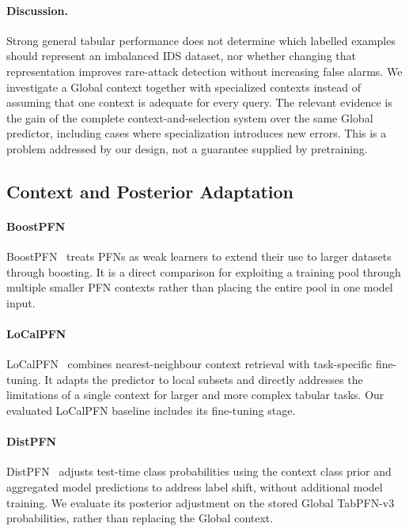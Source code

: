 \documentclass[sigconf,anonymous,pbalance]{acmart}
\begin{document}
\paragraph{Discussion.}
Strong general tabular performance does not determine which labelled examples should represent an imbalanced IDS dataset, nor whether changing that representation improves rare-attack detection without increasing false alarms. We investigate a Global context together with specialized contexts instead of assuming that one context is adequate for every query. The relevant evidence is the gain of the complete context-and-selection system over the same Global predictor, including cases where specialization introduces new errors. This is a problem addressed by our design, not a guarantee supplied by pretraining.

\subsection{Context and Posterior Adaptation}
\paragraph{BoostPFN}
BoostPFN~\cite{wang2025boostpfn} treats PFNs as weak learners to extend their use to larger datasets through boosting. It is a direct comparison for exploiting a training pool through multiple smaller PFN contexts rather than placing the entire pool in one model input.

\paragraph{LoCalPFN}
LoCalPFN~\cite{thomas2024retrieval} combines nearest-neighbour context retrieval with task-specific fine-tuning. It adapts the predictor to local subsets and directly addresses the limitations of a single context for larger and more complex tabular tasks. Our evaluated LoCalPFN baseline includes its fine-tuning stage.

\paragraph{DistPFN}
DistPFN~\cite{lee2026distpfn} adjusts test-time class probabilities using the context class prior and aggregated model predictions to address label shift, without additional model training. We evaluate its posterior adjustment on the stored Global TabPFN-v3 probabilities, rather than replacing the Global context.
\end{document}

